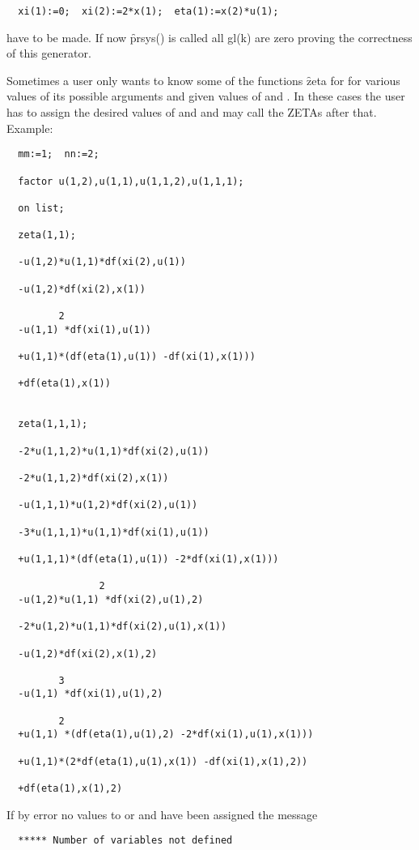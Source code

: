 \begin{verbatim}
  xi(1):=0;  xi(2):=2*x(1);  eta(1):=x(2)*u(1);
\end{verbatim}

have to be made. If now \f{prsys()} is called all gl(k) are zero
proving the correctness of this generator.

Sometimes a user only wants to know some of the functions \f{zeta} for for
various values of its possible arguments and given values of  and
. In these cases the user has to assign the desired values of  and
 and may call the ZETAs after that. Example:

\begin{verbatim}
  mm:=1;  nn:=2;

  factor u(1,2),u(1,1),u(1,1,2),u(1,1,1);

  on list;

  zeta(1,1);

  -u(1,2)*u(1,1)*df(xi(2),u(1))

  -u(1,2)*df(xi(2),x(1))

         2
  -u(1,1) *df(xi(1),u(1))

  +u(1,1)*(df(eta(1),u(1)) -df(xi(1),x(1)))

  +df(eta(1),x(1))


  zeta(1,1,1);

  -2*u(1,1,2)*u(1,1)*df(xi(2),u(1))

  -2*u(1,1,2)*df(xi(2),x(1))

  -u(1,1,1)*u(1,2)*df(xi(2),u(1))

  -3*u(1,1,1)*u(1,1)*df(xi(1),u(1))

  +u(1,1,1)*(df(eta(1),u(1)) -2*df(xi(1),x(1)))

                2
  -u(1,2)*u(1,1) *df(xi(2),u(1),2)

  -2*u(1,2)*u(1,1)*df(xi(2),u(1),x(1))

  -u(1,2)*df(xi(2),x(1),2)

         3
  -u(1,1) *df(xi(1),u(1),2)

         2
  +u(1,1) *(df(eta(1),u(1),2) -2*df(xi(1),u(1),x(1)))

  +u(1,1)*(2*df(eta(1),u(1),x(1)) -df(xi(1),x(1),2))

  +df(eta(1),x(1),2)
\end{verbatim}

If by error no values to  or  and have been assigned the message

\begin{verbatim}
  ***** Number of variables not defined
\end{verbatim}

